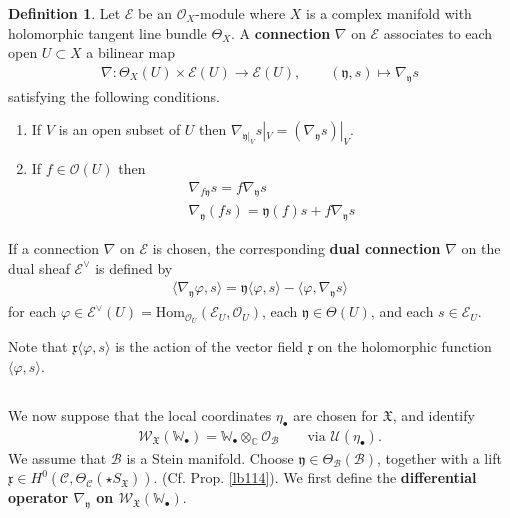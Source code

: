 \documentclass[11pt,b5paper,notitlepage]{article}
\theoremstyle{definition}
\newtheorem{df}{Definition}[section]
\theoremstyle{plain}
\newcommand{\fk}{\mathfrak}
\newcommand{\mc}{\mathcal}
\newcommand{\Hom}{\mathrm{Hom}}
\newcommand{\bk}[1]{\langle {#1}\rangle}
\newcommand{\scr}{\mathscr}
\newcommand{\xk}{\mathfrak x}
\newcommand{\yk}{\mathfrak y}
\newcommand{\SX}{{S_{\fk X}}}
\newcommand{\blt}{\bullet}
\newcommand{\Wbb}{\mathbb W}
\newcommand{\Cbb}{\mathbb C}
\numberwithin{equation}{section}
\begin{document}
\begin{df}
Let $\scr E$ be an $\scr O_X$-module where $X$ is a complex manifold with holomorphic tangent line bundle $\Theta_X$. A \textbf{connection} $\nabla$ on $\scr E$ associates to each open $U\subset X$ a bilinear map
\begin{align*}
\nabla:\Theta_X(U)\times\scr E(U)\rightarrow\scr E(U),\qquad (\yk,s)\mapsto\nabla_\yk s
\end{align*}
satisfying the following conditions.
\begin{enumerate}[label=(\alph*)]
\item If $V$ is an open subset of $U$ then $\nabla_{\yk|_V}s|_V=(\nabla_{\yk}s)|_V$.
\item If $f\in\scr O(U)$ then
\begin{subequations}
\begin{gather*}
\nabla_{f\yk}s=f\nabla_{\yk}s\\
\nabla_\yk(fs)=\yk(f)s+f\nabla_\yk s
\end{gather*}
\end{subequations}
\end{enumerate}
If a connection $\nabla$ on $\scr E$ is chosen, the corresponding \textbf{dual connection} $\nabla$ on the dual sheaf $\scr E^\vee$ is defined by
\begin{align}
\bk{\nabla_\yk\varphi,s}=\yk\bk{\varphi,s}-\bk{\varphi,\nabla_\yk s}\label{eq230}
\end{align}
for each $\varphi\in \scr E^\vee(U)=\Hom_{\scr O_U}(\scr E_U,\scr O_U)$, each $\yk\in\Theta(U)$, and each $s\in\scr E_U$.
\end{df}

Note that $\xk\bk{\varphi,s}$ is the action of the vector field $\xk$ on the holomorphic function $\bk{\varphi,s}$.


\subsection{}


We now suppose that the local coordinates $\eta_\blt$ are chosen for $\fk X$, and identify
\begin{align*}
\scr W_{\fk X}(\Wbb_\blt)=\Wbb_\blt\otimes_\Cbb\scr O_{\mc B}\qquad\text{via }\mc U(\eta_\blt).
\end{align*}
We assume that $\mc B$ is a Stein manifold. Choose $\yk\in\Theta_{\mc B}(\mc B)$, together with a lift $\xk\in H^0(\mc C,\Theta_{\mc C}(\star\SX))$. (Cf. Prop. \ref{lb114}).   We first define the \textbf{differential operator $\nabla_\yk$ on $\scr W_{\fk X}(\Wbb_\blt)$}. 
\end{document}
